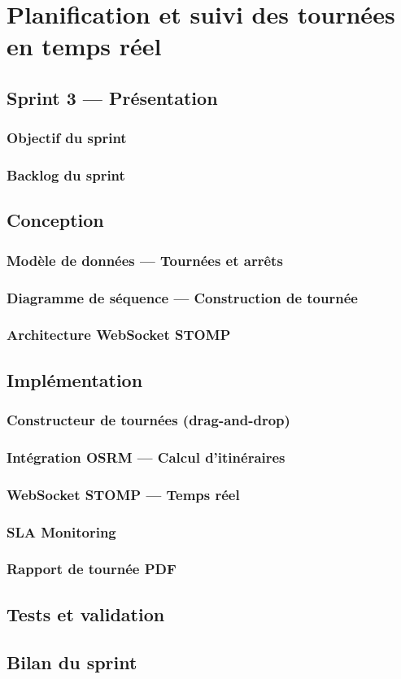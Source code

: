 \chapter{Planification et suivi des tournées en temps réel}

\section{Sprint 3 — Présentation}

\subsection{Objectif du sprint}
\subsection{Backlog du sprint}

\section{Conception}

\subsection{Modèle de données — Tournées et arrêts}
\subsection{Diagramme de séquence — Construction de tournée}
\subsection{Architecture WebSocket STOMP}

\section{Implémentation}

\subsection{Constructeur de tournées (drag-and-drop)}
\subsection{Intégration OSRM — Calcul d'itinéraires}
\subsection{WebSocket STOMP — Temps réel}
\subsection{SLA Monitoring}
\subsection{Rapport de tournée PDF}

\section{Tests et validation}

\section*{Bilan du sprint}
